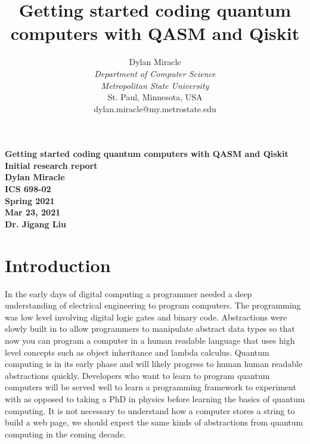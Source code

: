 \documentclass{article}
\begin{document}
\begin{titlepage}
    \begin{center}
        \vspace{4cm}
        \large
        \textbf{
            Getting started coding quantum computers with QASM and Qiskit \\
            Initial research report \\
            Dylan Miracle \\
            ICS 698-02 \\
            Spring 2021 \\
            Mar 23, 2021 \\
            Dr. Jigang Liu
        }
    \end{center}
\end{titlepage}
\title{Getting started coding quantum computers with QASM and Qiskit}

\author{Dylan Miracle\\
\textit{Department of Computer Science} \\
\textit{Metropolitan State University}\\
St. Paul, Minnesota, USA \\
dylan.miracle@my.metrostate.edu
}

\maketitle

\tableofcontents
\pagebreak

\section{Introduction}

In the early days of digital computing a programmer needed a deep understanding of electrical engineering to program computers. The programming was low level involving digital logic gates and binary code. Abstractions were slowly built in to allow programmers to manipulate abstract data types so that now you can program a computer in a human readable language that uses high level concepts such as object inheritance and lambda calculus. Quantum computing is in its early phase and will likely progress to human human readable abstractions quickly. Developers who want to learn to program quantum computers will be served well to learn a programming framework to experiment with as opposed to taking a PhD in physics before learning the basics of quantum computing. It is not necessary to understand how a computer stores a string to build a web page, we should expect the same kinds of abstractions from quantum computing in the coming decade.
\end{document}
